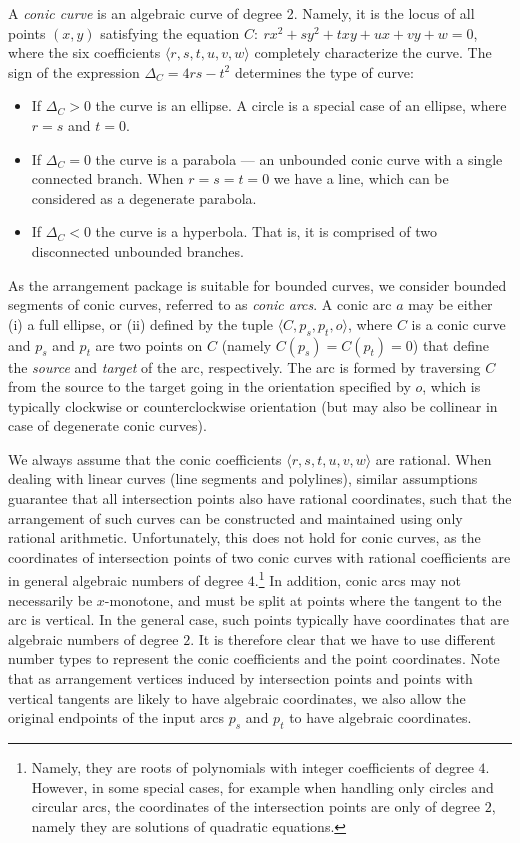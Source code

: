A {\em conic curve} is an algebraic curve of degree 2. Namely, it
is the locus of all points $(x,y)$ satisfying the equation $C:\ r
x^2 + s y^2 + t xy + u x + v y + w = 0$, where the six
coefficients $\langle r, s, t, u, v, w \rangle$ completely
characterize the curve. The sign of the expression $\Delta_{C} = 4
r s - t^2$ determines the type of curve:
\begin{itemize}
\item If $\Delta_{C} > 0$ the curve is an ellipse. A circle is a
special case of an ellipse, where $r = s$ and $t = 0$.
%
\item If $\Delta_{C} = 0$ the curve is a parabola --- an unbounded
conic curve with a single connected branch. When $r = s = t = 0$
we have a line, which can be considered as a degenerate parabola.
%
\item If $\Delta_{C} < 0$ the curve is a hyperbola. That is, it
is comprised of two disconnected unbounded branches.
\end{itemize}

As the arrangement package is suitable for bounded curves, we
consider bounded segments of conic curves, referred to as {\em
conic arcs}. A conic arc $a$ may be either (i) a full ellipse, or
(ii) defined by the tuple $\langle C, p_s, p_t, o \rangle$, where
$C$ is a conic curve and $p_s$ and $p_t$ are two points on $C$
(namely $C(p_s) = C(p_t) = 0$) that define the {\em source} and
{\em target} of the arc, respectively. The arc is formed by
traversing $C$ from the source to the target going in the
orientation specified by $o$, which is typically clockwise or
counterclockwise orientation (but may also be collinear in case of
degenerate conic curves).

We always assume that the conic coefficients $\langle r, s,
t, u, v, w \rangle$ are rational. When dealing with linear curves
(line segments and polylines), similar assumptions guarantee that
all intersection points also have rational coordinates, such that
the arrangement of such curves can be constructed and maintained
using only rational arithmetic. Unfortunately, this does not hold
for conic curves, as the coordinates of intersection points of two
conic curves with rational coefficients are in general algebraic
numbers of degree $4$.\footnote{Namely, they are roots of
polynomials with integer coefficients of degree $4$. However, in
some special cases, for example when handling only circles and
circular arcs, the coordinates of the intersection points are only
of degree $2$, namely they are solutions of quadratic equations.}
In addition, conic arcs may not necessarily be $x$-monotone, and
must be split at points where the tangent to the arc is vertical.
In the general case, such points typically have coordinates that
are algebraic numbers of degree $2$.
It is therefore clear that we have to use different number types
to represent the conic coefficients and the point coordinates.
Note that as arrangement vertices induced by intersection points
and points with vertical tangents are likely to have algebraic
coordinates, we also allow the original endpoints of the input arcs
$p_s$ and $p_t$ to have algebraic coordinates.

